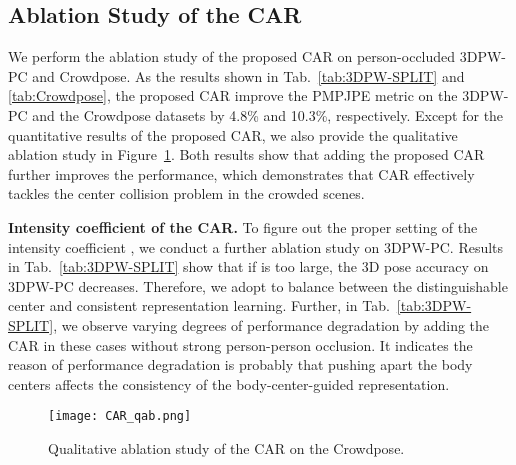 \documentclass[10pt,twocolumn,letterpaper]{article}
\begin{document}
\vspace{-1mm}
\subsection{Ablation Study of the CAR}
\vspace{-1mm}

We perform the ablation study of the proposed CAR on person-occluded 3DPW-PC and Crowdpose.
As the results shown in Tab.~\ref{tab:3DPW-SPLIT} and \ref{tab:Crowdpose}, the proposed CAR improve the PMPJPE metric on the 3DPW-PC and the Crowdpose datasets by 4.8\% and 10.3\%, respectively.
Except for the quantitative results of the proposed CAR, we also provide the qualitative ablation study in Figure~\ref{fig:CAR_qab}.
Both results show that adding the proposed CAR further improves the performance, which demonstrates that CAR effectively tackles the center collision problem in the crowded scenes.

\textbf{Intensity coefficient  of the CAR. }
To figure out the proper setting of the intensity coefficient , we conduct a further ablation study on 3DPW-PC.
Results in Tab.~\ref{tab:3DPW-SPLIT} show that if  is too large, the 3D pose accuracy on 3DPW-PC  decreases. 
Therefore, we adopt  to balance between the distinguishable center and consistent representation learning.
Further, in Tab.~\ref{tab:3DPW-SPLIT}, we observe varying degrees of performance degradation by adding the CAR in these cases without strong person-person occlusion.
It indicates the reason of performance degradation is probably that pushing apart the body centers affects the consistency of the body-center-guided representation.

\begin{figure}[t]
	\centering
	\texttt{[image: CAR\_qab.png]}
	\caption{Qualitative ablation study of the CAR on the Crowdpose.}\vspace{-5mm}
	\label{fig:CAR_qab}
\end{figure}

\vspace{-1mm}
\end{document}
